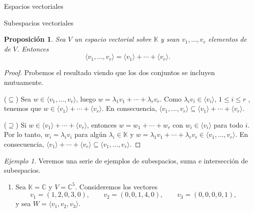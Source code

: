 \documentclass[a4paper,12pt,twoside,spanish,reqno]{amsbook}
\numberwithin{equation}{section}
\newtheorem{proposicion}[teorema]{Proposici\'on}
\theoremstyle{definition}
\theoremstyle{remark}
\newtheorem*{ejemplo*}{Ejemplo}
\newcommand{\C}{\mathbb C}
\newcommand{\K}{\mathbb K}
\begin{document}
\begin{chapter}{Espacios vectoriales}
\begin{section}{Subespacios vectoriales}
    \begin{proposicion}
        Sea $V$ un espacio vectorial sobre $\K$ y sean $v_1,\ldots,v_r$ elementos de   de $V$. Entonces
        \begin{equation*}
            \langle v_1,\ldots,v_r \rangle = \langle v_1 \rangle+ \cdots + \langle v_r \rangle.
        \end{equation*}
    \end{proposicion}
    \begin{proof}
        Probemos el resultado viendo que los dos conjuntos se incluyen mutuamente.
        
        ($\subseteq$) Sea $w \in \langle v_1,\ldots,v_r \rangle$, luego $w = \lambda_1 v_1 +\cdots+ \lambda_r v_r$. Como $ \lambda_i v_i \in \langle v_i \rangle$, $1 \le i \le r$ ,  tenemos que  $w \in \langle v_1 \rangle+ \cdots + \langle v_r \rangle$.  En  consecuencia, $\langle v_1,\ldots,v_r \rangle \subseteq \langle v_1 \rangle+ \cdots + \langle v_r \rangle$. 
        
        ($\supseteq$) Si $w \in \langle v_1 \rangle+ \cdots + \langle v_r \rangle$, entonces $w = w_1 + \cdots+w_r$ con $w_i \in \langle v_i\rangle$ para todo $i$. Por lo tanto, $w_i = \lambda_i v_i$ para algún $\lambda_i \in \K$ y  $w = \lambda_1 v_1 +\cdots+ \lambda_r v_r \in \langle v_1,\ldots,v_r \rangle $. En  consecuencia, $\langle v_1 \rangle+ \cdots + \langle v_r \rangle \subseteq \langle v_1,\ldots,v_r \rangle$. 
    \end{proof}



        



    \begin{ejemplo*}\label{ejemplos2} Veremos una serie de ejemplos de subespacios,  suma e intersección de subespacios.
        \begin{enumerate}
            \item\label{ejemplos2-1} Sea $\K = \C$ y $V= \C^5$. Consideremos los vectores
            \begin{equation*}
                v_1 = (1,2,0,3,0), \qquad v_2 = (0,0,1,4,0), \qquad v_3 = (0,0,0,0,1),
            \end{equation*}
            y sea $W= \langle v_1,v_2,v_3 \rangle$. 
            

\end{enumerate}
\end{ejemplo*}
\end{section}
\end{chapter}
\end{document}
